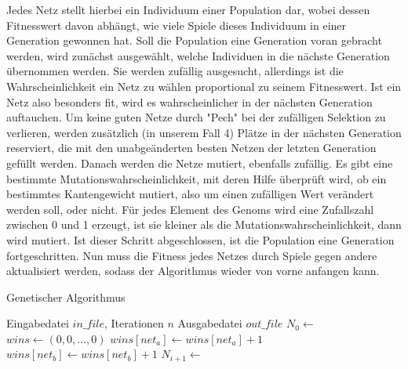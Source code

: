 Jedes Netz stellt hierbei ein Individuum einer Population dar, wobei
dessen Fitnesswert davon abhängt, wie viele Spiele dieses Individuum
in einer Generation gewonnen hat. Soll die Population eine
Generation voran gebracht werden, wird zunächst ausgewählt, welche Individuen in
die nächste Generation übernommen werden. Sie werden zufällig ausgesucht,
allerdings ist die Wahrscheinlichkeit ein Netz zu wählen proportional zu seinem
Fitnesswert. Ist ein Netz also besonders fit, wird es wahrscheinlicher in der
nächsten Generation auftauchen. Um keine guten Netze durch "Pech" bei der 
zufälligen Selektion zu verlieren, werden zusätzlich (in unserem Fall 4) Plätze 
in der nächsten Generation reserviert, die mit den unabgeänderten besten Netzen 
der letzten Generation gefüllt werden. Danach werden die Netze mutiert, 
ebenfalls zufällig. Es gibt eine bestimmte Mutationswahrscheinlichkeit, mit 
deren Hilfe überprüft wird, ob ein bestimmtes Kantengewicht mutiert, also um einen
zufälligen Wert verändert werden soll, oder nicht. Für jedes Element des Genoms
wird eine Zufallszahl zwischen 0 und 1 erzeugt, ist sie kleiner als die
Mutationswahrscheinlichkeit, dann wird mutiert. Ist dieser Schritt abgeschlossen, 
ist die Population eine Generation fortgeschritten. Nun muss die Fitness jedes Netzes
durch Spiele gegen andere aktualisiert werden, sodass der Algorithmus 
wieder von vorne anfangen kann.

\begin{algorithm}
    \caption{Genetischer Algorithmus}
    \label{alg:genetic}
    \begin{algorithmic}[1]
        \Require Eingabedatei $in\_file$, Iterationen $n$
        \Ensure Ausgabedatei $out\_file$
        \State $N_0 \gets$ 
            \State $wins \gets (0, 0, \ldots, 0)$
                \State {}
                    \State $wins[net_a] \gets wins[net_a] + 1$
                \Else
                    \State $wins[net_b] \gets wins[net_b] + 1$
                \EndIf
            \EndFor
            \State $N_{i+1} \gets$ 
        \EndFor
        \State {}
    \end{algorithmic}
\end{algorithm}


